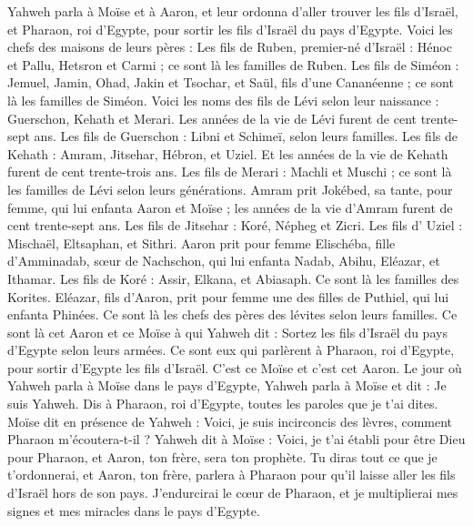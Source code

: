 \begin{multicols}{2}
Yahweh parla à Moïse et à Aaron, et leur ordonna d'aller trouver les fils d'Israël, et Pharaon, roi d'Egypte, pour sortir les fils d'Israël du pays d'Egypte.
Voici les chefs des maisons de leurs pères : Les fils de Ruben, premier-né d'Israël : Hénoc et Pallu, Hetsron et Carmi ; ce sont là les familles de Ruben.
Les fils de Siméon : Jemuel, Jamin, Ohad, Jakin et Tsochar, et Saül, fils d'une Cananéenne ; ce sont là les familles de Siméon.
Voici les noms des fils de Lévi selon leur naissance : Guerschon, Kehath et Merari. Les années de la vie de Lévi furent de cent trente-sept ans.
Les fils de Guerschon : Libni et Schimeï, selon leurs familles.
Les fils de Kehath : Amram, Jitsehar, Hébron, et Uziel. Et les années de la vie de Kehath furent de cent trente-trois ans.
Les fils de Merari : Machli et Muschi ; ce sont là les familles de Lévi selon leurs générations.
Amram prit Jokébed, sa tante, pour femme, qui lui enfanta Aaron et Moïse ; les années de la vie d’Amram furent de cent trente-sept ans.
Les fils de Jitsehar : Koré, Népheg et Zicri.
Les fils d’ Uziel : Mischaël, Eltsaphan, et Sithri.
Aaron prit pour femme Elischéba, fille d’Amminadab, sœur de Nachschon, qui lui enfanta Nadab, Abihu, Eléazar, et Ithamar.
Les fils de Koré : Assir, Elkana, et Abiasaph. Ce sont là les familles des Korites.
Eléazar, fils d'Aaron, prit pour femme une des filles de Puthiel, qui lui enfanta Phinées. Ce sont là les chefs des pères des lévites selon leurs familles.
Ce sont là cet Aaron et ce Moïse à qui Yahweh dit : Sortez les fils d'Israël du pays d'Egypte selon leurs armées.
Ce sont eux qui parlèrent à Pharaon, roi d'Egypte, pour sortir d'Egypte les fils d'Israël. C'est ce Moïse et c'est cet Aaron.
Le jour où Yahweh parla à Moïse dans le pays d'Egypte,
Yahweh parla à Moïse et dit : Je suis Yahweh. Dis à Pharaon, roi d'Egypte, toutes les paroles que je t'ai dites.
Moïse dit en présence de Yahweh : Voici, je suis incirconcis des lèvres, comment Pharaon m'écoutera-t-il ?
\VerseOne{}Yahweh dit à Moïse : Voici, je t'ai établi pour être Dieu pour Pharaon, et Aaron, ton frère, sera ton prophète.
Tu diras tout ce que je t’ordonnerai, et Aaron, ton frère, parlera à Pharaon pour qu'il laisse aller les fils d'Israël hors de son pays.
J'endurcirai le cœur de Pharaon, et je multiplierai mes signes et mes miracles dans le pays d'Egypte.

\end{multicols}
